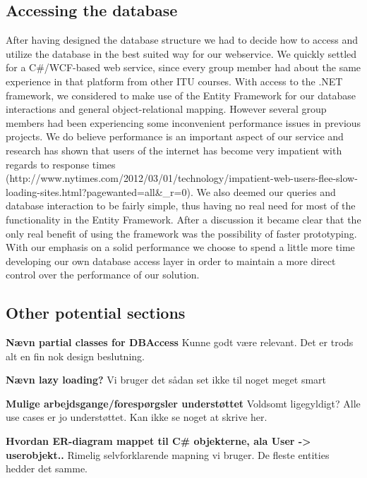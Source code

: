 \subsection{Accessing the database}
\label{sec:databaseaccess}
After having designed the database structure we had to decide how to access and utilize the database in the best suited way for our webservice. We quickly settled for a C\#/WCF-based web service, since every group member had about the same experience in that platform from other ITU courses.
With access to the .NET framework, we considered to make use of the Entity Framework for our database interactions and general object-relational mapping. However several group members had been experiencing some inconvenient performance issues in previous projects. We do believe performance is an important aspect of our service and research has shown that users of the internet has become very impatient with regards to response times (http://www.nytimes.com/2012/03/01/technology/impatient-web-users-flee-slow-loading-sites.html?pagewanted=all\&_r=0). We also deemed our queries and database interaction to be fairly simple, thus having no real need for most of the functionality in the Entity Framework. After a discussion it became clear that the only real benefit of using the framework was the possibility of faster prototyping. With our emphasis on a solid performance we choose to spend a little more time developing our own database access layer in order to maintain a more direct control over the performance of our solution.

\subsection{Other potential sections}
\textbf{Nævn partial classes for DBAccess}
Kunne godt være relevant. Det er trods alt en fin nok design beslutning.

\textbf{Nævn lazy loading?}
Vi bruger det sådan set ikke til noget meget smart

\textbf{Mulige arbejdsgange/forespørgsler understøttet}
Voldsomt ligegyldigt? Alle use cases er jo understøttet. Kan ikke se noget at skrive her.

\textbf{Hvordan ER-diagram mappet til C\# objekterne, ala User -> userobjekt..}
Rimelig selvforklarende mapning vi bruger. De fleste entities hedder det samme.